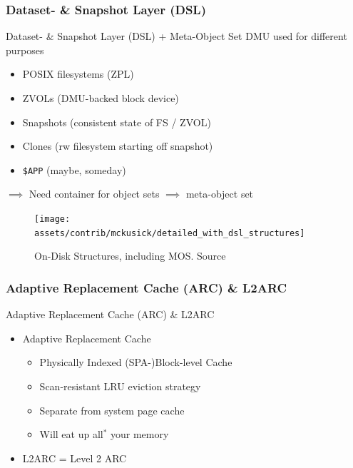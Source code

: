 \subsubsection{Dataset- \& Snapshot Layer (DSL)}
\begin{frame}[allowframebreaks]{Dataset- \& Snapshot Layer (DSL) + Meta-Object Set}
	DMU used for different purposes \vspace{10pt}
	\begin{itemize}
		\item POSIX filesystems (ZPL) %
		\item ZVOLs (DMU-backed block device)
		\item Snapshots (consistent state of FS / ZVOL)
		\item Clones (rw filesystem starting off snapshot)
		\item \texttt{\$APP} (maybe, someday)
	\end{itemize}  \vspace{10pt}
	$\implies$ Need container for object sets $\implies$ \alert{meta-object set}
	\pagebreak
	\begin{figure}
	\centering
	\texttt{[image: assets/contrib/mckusick/detailed\_with\_dsl\_structures]}
	\caption{On-Disk Structures, including MOS. Source \cite{introimplzfs}}
	\end{figure}
\end{frame}

\subsubsection{Adaptive Replacement Cache (ARC) \& L2ARC}
\begin{frame}{Adaptive Replacement Cache (ARC) \& L2ARC}
\begin{itemize}
	\item Adaptive Replacement Cache
	\begin{itemize}
		\item Physically Indexed (SPA-)Block-level Cache %
		\item Scan-resistant LRU eviction strategy %
		\item Separate from system page cache %
		\item Will eat up all$^*$ your memory
	\end{itemize}
	\item L2ARC = Level 2 ARC %
\end{itemize}
\end{frame}

